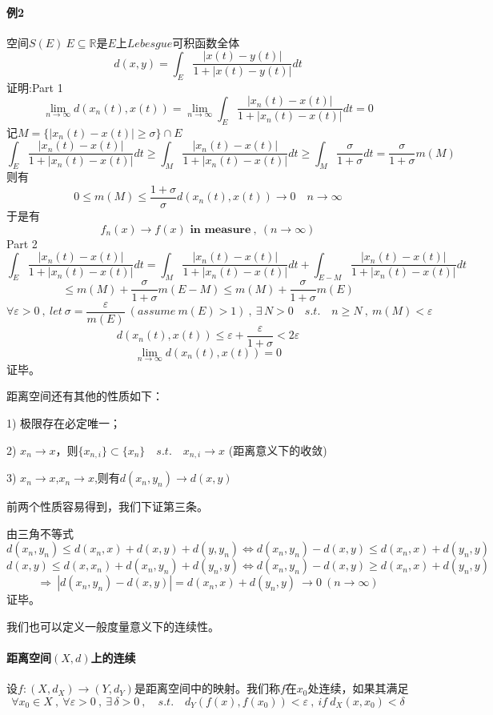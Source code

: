 \paragraph*{例2} \quad 空间$S(E) \ E \subseteq \mathbb{R}$是$E$上$Lebesgue$可积函数全体
\[d(x,y)=\int_E\frac{\left|x(t)-y(t)\right|}{1+\left|x(t)-y(t)\right|}dt\]
证明:Part 1
\[\lim_{n \rightarrow \infty}d(x_n(t),x(t))=\lim_{n \rightarrow \infty}\int_E\frac{\left|x_n(t)-x(t)\right|}{1+\left|x_n(t)-x(t)\right|}dt=0\]
记$M=\{|x_n(t)-x(t)| \geq \sigma\}\cap E$
\[\int_E\frac{\left|x_n(t)-x(t)\right|}{1+\left|x_n(t)-x(t)\right|}dt \geq \int_M\frac{\left|x_n(t)-x(t)\right|}{1+\left|x_n(t)-x(t)\right|}dt \geq \int_M\frac{\sigma}{1+\sigma}dt=\frac{\sigma}{1+\sigma}m(M)\]
则有
\[0 \leq m(M) \leq \frac{1+\sigma}{\sigma}d(x_n(t),x(t))\rightarrow 0 \quad n \rightarrow \infty\]
于是有
\[f_n(x) \rightarrow f(x)\textbf{ in measure} \ , \ (n \rightarrow \infty)\]
Part 2
\[\int_E\frac{\left|x_n(t)-x(t)\right|}{1+\left|x_n(t)-x(t)\right|}dt=\int_M\frac{\left|x_n(t)-x(t)\right|}{1+\left|x_n(t)-x(t)\right|}dt+\int_{E-M}\frac{\left|x_n(t)-x(t)\right|}{1+\left|x_n(t)-x(t)\right|}dt\]
\[\leq m(M)+\frac{\sigma}{1+\sigma}m(E-M) \leq m(M)+\frac{\sigma}{1+\sigma}m(E)\]
\[\forall \varepsilon>0 \ , \ let \ \sigma=\frac{\varepsilon}{m(E)} \ (assume \ m(E)>1) \ , \ \exists \, N>0 \quad s.t. \quad n \geq N \ , \ m(M)<\varepsilon\]
\[d(x_n(t),x(t)) \leq \varepsilon+\frac{\varepsilon}{1+\sigma}<2\varepsilon\]
\[\lim_{n \rightarrow \infty}d(x_n(t),x(t))=0\]
证毕。

距离空间还有其他的性质如下：

1) 极限存在必定唯一；

2) $x_n \rightarrow x$，则$\{x_{n,i}\} \subset \{x_n\} \quad s.t. \quad x_{n,i} \rightarrow x$ (距离意义下的收敛)

3) $x_n \rightarrow x$,$x_n \rightarrow x$,则有$d(x_n,y_n) \rightarrow d(x,y)$

前两个性质容易得到，我们下证第三条。

由三角不等式
\[d(x_n,y_n) \leq d(x_n,x)+d(x,y)+d(y,y_n) \Leftrightarrow d(x_n,y_n)-d(x,y) \leq d(x_n,x)+d(y_n,y)\]
\[d(x,y) \leq d(x,x_n)+d(x_n,y_n)+d(y_n,y) \Leftrightarrow d(x_n,y_n)-d(x,y) \geq d(x_n,x)+d(y_n,y)\]
\[\Rightarrow \ |d(x_n,y_n)-d(x,y)|=d(x_n,x)+d(y_n,y) \ \rightarrow 0 \ (n \rightarrow \infty)\]
证毕。

我们也可以定义一般度量意义下的连续性。
\paragraph*{距离空间$(X,d)$上的连续} \quad 设$f:(X,d_X) \rightarrow (Y,d_Y)$是距离空间中的映射。我们称$f$在$x_0$处连续，如果其满足
\[\forall x_0 \in X \ , \ \forall \varepsilon>0 \ , \ \exists \, \delta>0 \ , \quad s.t. \quad d_Y(f(x),f(x_0))<\varepsilon \ , \ if \ d_X(x,x_0)<\delta\]

